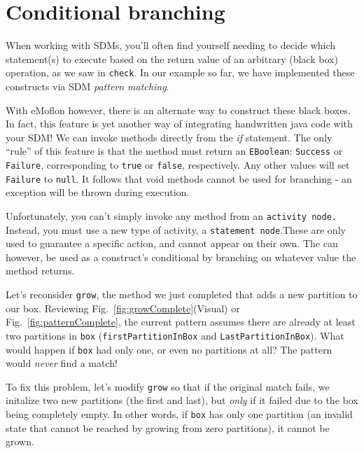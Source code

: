 \newpage
\hypertarget{sec:conBran}{}
\section{Conditional branching}
\genHeader

When working with SDMs, you'll often find yourself needing to decide which statement(s) to execute based on the return value of an arbitrary (black box)
operation, as we saw in \texttt{check}. In our example so far, we have implemented these constructs via SDM \emph{pattern matching}. 

With eMoflon however, there is an alternate way to construct these black boxes. In fact, this feature is yet another way of integrating handwritten java code
with your SDM! We can invoke methods directly from the \emph{if} statement. The only ``rule'' of this feature is that the method must return an
\texttt{EBoolean}: \texttt{Success} or \texttt{Failure}, corresponding to \texttt{true} or \texttt{false}, respectively. Any other values will set
\texttt{Failure} to \texttt{null}. It follows that void methods cannot be used for branching - an exception will be thrown during execution.

Unfortunately, you can't simply invoke any method from an \texttt{activity node.} Instead, you must use a new type of activity, a \texttt{statement
node}.These are only used to guarantee a specific action, and cannot appear on their own. The can however, be used as a construct's
conditional by branching on whatever value the method returns.

Let's reconsider \texttt{grow}, the method we just completed that adds a new partition to our box. Reviewing Fig.~\ref{fig:growComplete}(Visual) or
Fig.~\ref{fig:patternComplete}, the current pattern assumes there are already at least two partitions in \texttt{box} (\texttt{firstPartitionInBox} and
\texttt{LastPartitionInBox}). What would happen if \texttt{box} had only one, or even no partitions at all? The pattern would \emph{never} find a match!

To fix this problem, let's modify \texttt{grow} so that if the original match fails, we initalize two new partitions (the first and last), but \emph{only} if it
failed due to the box being completely empty. In other words, if \texttt{box} has only one partition (an invalid state that cannot be reached by
growing from zero partitions), it cannot be grown.





